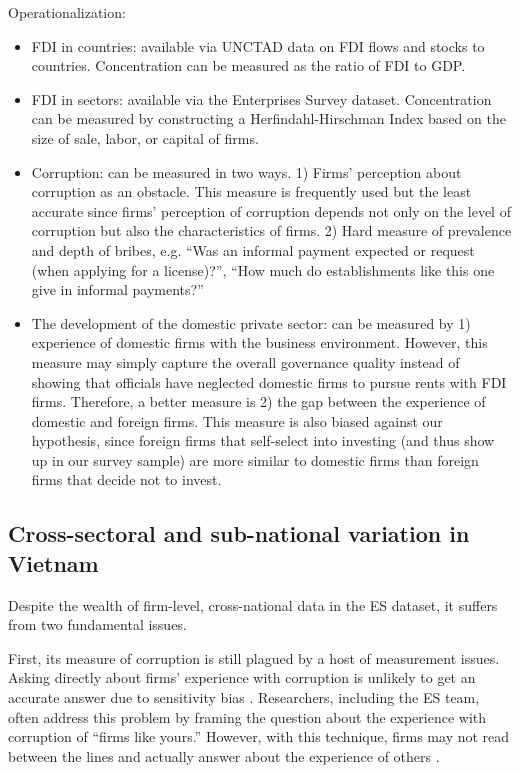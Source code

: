 Operationalization:
\begin{itemize}
\item FDI in countries: available via UNCTAD data on FDI flows and stocks to countries. Concentration can be measured as the ratio of FDI to GDP.
\item FDI in sectors: available via the Enterprises Survey dataset. Concentration can be measured by constructing a Herfindahl-Hirschman Index based on the size of sale, labor, or capital of firms.
\item Corruption: can be measured in two ways. 1) Firms' perception about corruption as an obstacle. This measure is frequently used but the least accurate since firms' perception of corruption depends not only on the level of corruption but also the characteristics of firms. 2) Hard measure of prevalence and depth of bribes, e.g. ``Was an informal payment expected or request (when applying for a license)?'', ``How much do establishments like this one give in informal payments?''  

\item The development of the domestic private sector: can be measured by 1) experience of domestic firms with the business environment. However, this measure may simply capture the overall governance quality instead of showing that officials have neglected domestic firms to pursue rents with FDI firms. Therefore, a better measure is 2) the gap between the experience of domestic and foreign firms. This measure is also biased against our hypothesis, since foreign firms that self-select into investing (and thus show up in our survey sample) are more similar to domestic firms than foreign firms that decide not to invest.
\end{itemize}

\subsection{Cross-sectoral and sub-national variation in Vietnam}

Despite the wealth of firm-level, cross-national data in the ES dataset, it suffers from two fundamental issues.

First, its measure of corruption is still plagued by a host of measurement issues. Asking directly about firms' experience with corruption is unlikely to get an accurate answer due to sensitivity bias \citep{Coutts2011}. Researchers, including the ES team, often address this problem by framing the question about the experience with corruption of ``firms like yours.'' However, with this technique, firms may not read between the lines and actually answer about the experience of others \citep{Ahart2004}.

